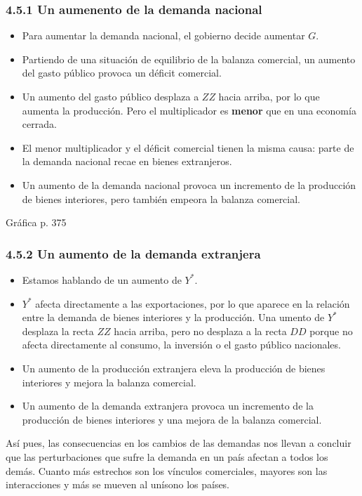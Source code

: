 \documentclass[10pt]{article}
\begin{document}
\begin{multicols*}{2}
\subsubsection{4.5.1 Un aumenento de la demanda nacional}
\begin{itemize}
    \item Para aumentar la demanda nacional, el gobierno decide aumentar $G$.
    \item Partiendo de una situación de equilibrio de la balanza comercial, un aumento del gasto público provoca un déficit comercial.
    \item Un aumento del gasto público desplaza a $ZZ$ hacia arriba, por lo que aumenta la producción. Pero el multiplicador es \textbf{menor} que en una economía cerrada.
    \item El menor multiplicador y el déficit comercial tienen la misma causa: parte de la demanda nacional recae en bienes extranjeros.
    \item Un aumento de la demanda nacional provoca un incremento de la producción de bienes interiores, pero también empeora la balanza comercial.
\end{itemize}

Gráfica p. 375

\subsubsection{4.5.2 Un aumento de la demanda extranjera}
\begin{itemize}    
    \item Estamos hablando de un aumento de $Y^*$.
    \item $Y^*$ afecta directamente a las exportaciones, por lo que aparece en la relación entre la demanda de bienes interiores y la producción. Una umento de $Y^*$ desplaza la recta $ZZ$ hacia arriba, pero no desplaza a la recta $DD$ porque no afecta directamente al consumo, la inversión o el gasto público nacionales. 
    \item Un aumento de la producción extranjera eleva la producción de bienes interiores y  mejora la balanza comercial.
    \item Un aumento de la demanda extranjera provoca un incremento de la producción de bienes interiores y una mejora de la balanza comercial.
\end{itemize}

Así pues, las consecuencias en los cambios de las demandas nos llevan a concluir que las perturbaciones que sufre la demanda en un país afectan a todos los demás. Cuanto más estrechos son los vínculos comerciales, mayores son las interacciones y más se mueven al unísono los países.


\end{multicols*}
\end{document}

